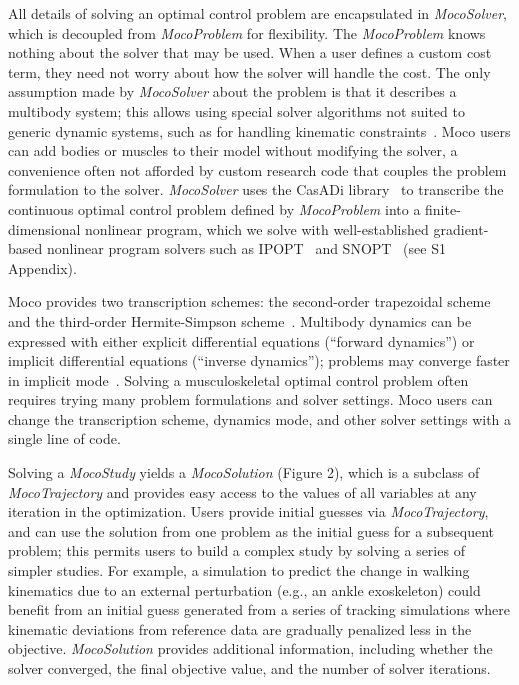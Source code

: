 \documentclass[10pt,letterpaper]{article}
\begin{document}
All details of solving an optimal control problem are encapsulated in \textit{MocoSolver}, which is decoupled from \textit{MocoProblem} for flexibility. The \textit{MocoProblem} knows nothing about the solver that may be used. When a user defines a custom cost term, they need not worry about how the solver will handle the cost. The only assumption made by \textit{MocoSolver} about the problem is that it describes a multibody system; this allows using special solver algorithms not suited to generic dynamic systems, such as for handling kinematic constraints~\cite{Posa:2016}. Moco users can add bodies or muscles to their model without modifying the solver, a convenience often not afforded by custom research code that couples the problem formulation to the solver. \textit{MocoSolver} uses the CasADi library~\cite{Andersson:2019} to transcribe the continuous optimal control problem defined by \textit{MocoProblem} into a finite-dimensional nonlinear program, which we solve with well-established gradient-based nonlinear program solvers such as IPOPT~\cite{Wachter:2006} and SNOPT~\cite{Gill:2005} (see S1 Appendix).

Moco provides two transcription schemes: the second-order trapezoidal scheme and the third-order Hermite-Simpson scheme~\cite{Betts:2010}. Multibody dynamics can be expressed with either explicit differential equations (“forward dynamics”) or implicit differential equations (“inverse dynamics”); problems may converge faster in implicit mode~\cite{vandenBogert:2011fv,Groote:2016dq}. Solving a musculoskeletal optimal control problem often requires trying many problem formulations and solver settings. Moco users can change the transcription scheme, dynamics mode, and other solver settings with a single line of code.

Solving a \textit{MocoStudy} yields a \textit{MocoSolution} (Figure 2), which is a subclass of \textit{MocoTrajectory} and provides easy access to the values of all variables at any iteration in the optimization. Users provide initial guesses via \textit{MocoTrajectory}, and can use the solution from one problem as the initial guess for a subsequent problem; this permits users to build a complex study by solving a series of simpler studies. For example, a simulation to predict the change in walking kinematics due to an external perturbation (e.g., an ankle exoskeleton) could benefit from an initial guess generated from a series of tracking simulations where kinematic deviations from reference data are gradually penalized less in the objective. \textit{MocoSolution} provides additional information, including whether the solver converged, the final objective value, and the number of solver iterations.
\end{document}
